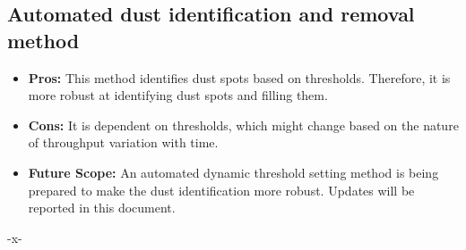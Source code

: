 \documentclass[11pt,a4paper]{article}
\begin{document}
	\subsection{Automated dust identification and removal method}
	\begin{itemize}
	\item \textbf{Pros:} This method identifies dust spots based on thresholds. Therefore, it is more robust at identifying dust spots and filling them.
	\item \textbf{Cons:} It is dependent on thresholds, which might change based on the nature of throughput variation with time.
	\item \textbf{Future Scope:} An automated dynamic threshold setting method is being prepared to make the dust identification more robust. Updates will be reported in this document.
	\end{itemize}
	\begin{center}
		-x-
	\end{center}
\end{document}
